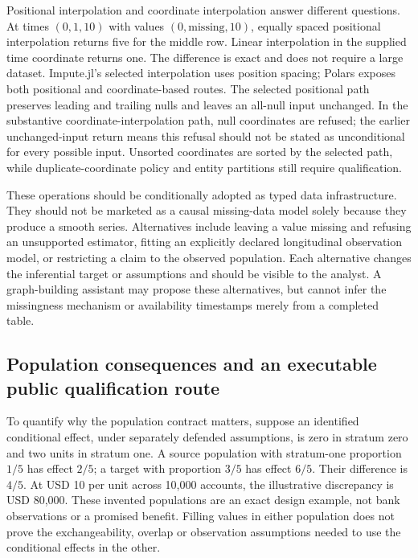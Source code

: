 Positional interpolation and coordinate interpolation answer different questions. At times $(0,1,10)$ with values $(0,\mathrm{missing},10)$, equally spaced positional interpolation returns five for the middle row. Linear interpolation in the supplied time coordinate returns one. The difference is exact and does not require a large dataset. Impute.jl's selected interpolation uses position spacing; Polars exposes both positional and coordinate-based routes. The selected positional path preserves leading and trailing nulls and leaves an all-null input unchanged. In the substantive coordinate-interpolation path, null coordinates are refused; the earlier unchanged-input return means this refusal should not be stated as unconditional for every possible input. Unsorted coordinates are sorted by the selected path, while duplicate-coordinate policy and entity partitions still require qualification.~\citep{exec25_otm_imputejl,exec25_otm_polars,exec25_otm_choice}

These operations should be conditionally adopted as typed data infrastructure. They should not be marketed as a causal missing-data model solely because they produce a smooth series. Alternatives include leaving a value missing and refusing an unsupported estimator, fitting an explicitly declared longitudinal observation model, or restricting a claim to the observed population. Each alternative changes the inferential target or assumptions and should be visible to the analyst. A graph-building assistant may propose these alternatives, but cannot infer the missingness mechanism or availability timestamps merely from a completed table.~\citep{exec25_otm_choice}

\subsection{Population consequences and an executable public qualification route}

To quantify why the population contract matters, suppose an identified conditional effect, under separately defended assumptions, is zero in stratum zero and two units in stratum one. A source population with stratum-one proportion $1/5$ has effect $2/5$; a target with proportion $3/5$ has effect $6/5$. Their difference is $4/5$. At USD 10 per unit across 10,000 accounts, the illustrative discrepancy is USD 80,000. These invented populations are an exact design example, not bank observations or a promised benefit. Filling values in either population does not prove the exchangeability, overlap or observation assumptions needed to use the conditional effects in the other.~\citep{exec25_otm_choice}

